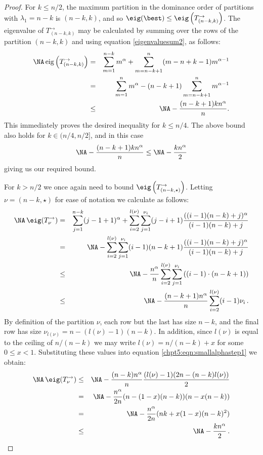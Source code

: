 \documentclass[11pt]{report}
\begin{document}
\begin{proof}
	For $k\le n/2$, the maximum partition in the dominance order of 
	partitions with $\lambda_{1}=n-k$ is $(n-k,k)$, and so $\eig(\best) \le \eig\left(T_{(n-k,k)}^{\rightarrow}\right)$. The eigenvalue of $T_{(n-k,k)}^{\rightarrow}$ may be calculated by summing over the rows of the partition $(n-k,k)$ and 
	using equation \eqref{eigenvaluesum2}, as follows:
	\begin{eqnarray*}
		\NA \, 
		\textnormal{eig}\left(T_{(n-k,k)}^{\rightarrow}\right) & = &
		\sum_{m=1}^{n-k} m^{\alpha} + \sum_{m=n-k+1}^{n} (m-n+k-1) m^{\alpha-1} \\
		& = & \sum_{m=1}^{n} m^{\alpha} -(n-k+1) \sum_{m=n-k+1}^{n} m^{\alpha-1}
		\\
		& \leq & \NA -\frac{(n-k+1)kn^{\alpha}}{n}.
	\end{eqnarray*}
	This immediately proves the desired inequality for $k\le n/4$. The above bound also holds for $k \in (n/4, n/2]$, and in this case
	\[\NA -\frac{(n-k+1)kn^{\alpha}}{n} \leq\NA - \frac{kn^{\alpha}}{2} \]
	giving us our required bound.
	
	For $k>n/2$ we once again need to bound 
	$\eig\left(T_{(n-k,\star)}^{\rightarrow}\right)$. Letting $\nu 
	=(n-k,\star)$ for ease of notation we calculate as follows:
	\begin{eqnarray}
	\NA \, 
	\eig(T_{\nu}^{\rightarrow}) & = & \sum_{j=1}^{n-k} 
	(j-1+1)^{\alpha}  + \sum_{i=2}^{l(\nu)} 
	\sum_{j=1}^{\nu_{i}} (j-i+1)  \frac{((i-1) (n-k)
		+j)^{\alpha}}{(i-1) (n-k) +j} \nonumber\\
		& = & \NA - \sum_{i=2}^{l(\nu)} 
	\sum_{j=1}^{\nu_{i}} (i-1) (n-k+1)  
	\frac{((i-1) (n-k)+j)^{\alpha}}{(i-1) (n-k)+j}\nonumber \\
	& \leq & \NA - 
	\frac{n^\alpha}{n}\sum_{i=2}^{l(\nu)} 
	\sum_{j=1}^{\nu_{i}} \left((i-1)\cdot (n-k+1)\right) \nonumber\\
	& \leq & \NA -\frac{(n-k+1)n^{\alpha}}{n} 
	\sum_{i=2}^{l(\nu)} (i-1)  \nu_{i} \, \label{chpt5:eqn:smallalphastep1}. 
	\end{eqnarray}
	By definition of the partition $\nu$, each row but the last has size $n-k$, and the final row has size $\nu_{l(\nu)} = n-(l(\nu)-1)(n-k)$. In addition, since $l(\nu)$ is equal to the ceiling of $n/(n-k)$ we may write $l(\nu) = n/(n-k)+x$ for some $0\le x<1$.	Substituting these values into equation \eqref{chpt5:eqn:smallalphastep1} we obtain:
	\begin{eqnarray*}
		\NA \, 
		\eig(T_{\nu}^{\rightarrow}) 
		& \leq & \NA
		-\frac{(n-k)n^{\alpha}}{n} 
		\frac{(l(\nu)-1)( 2n - (n-k)l(\nu))}{2}\\
		& = & \NA
		-\frac{n^{\alpha}}{2n} (n - (1-x)(n-k)) (n-x(n-k))\\
		& = & \NA
		-\frac{n^{\alpha}}{2n} (nk+x(1-x)(n-k)^2)\\
		& \leq & 
		\NA -\frac{kn^{\alpha}}{2}\,. 
	\end{eqnarray*}	
\end{proof}
\end{document}
